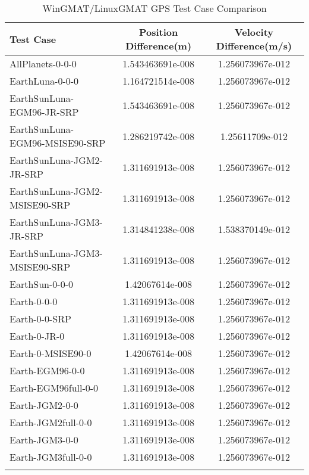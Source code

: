 \begin{table}[htbp!]
\centering
\caption{ WinGMAT/LinuxGMAT GPS Test Case Comparison}
      \begin{tabular}{lcc}
      \hline\hline
          Test Case & Position Difference(m) & Velocity Difference(m/s) \\
         \hline
         AllPlanets-0-0-0 & 1.543463691e-008 & 1.256073967e-012 \\
         EarthLuna-0-0-0 & 1.164721514e-008 & 1.256073967e-012 \\
         EarthSunLuna-EGM96-JR-SRP & 1.543463691e-008 & 1.256073967e-012 \\
         EarthSunLuna-EGM96-MSISE90-SRP & 1.286219742e-008 & 1.25611709e-012 \\
         EarthSunLuna-JGM2-JR-SRP & 1.311691913e-008 & 1.256073967e-012 \\
         EarthSunLuna-JGM2-MSISE90-SRP & 1.311691913e-008 & 1.256073967e-012 \\
         EarthSunLuna-JGM3-JR-SRP & 1.314841238e-008 & 1.538370149e-012 \\
         EarthSunLuna-JGM3-MSISE90-SRP & 1.311691913e-008 & 1.256073967e-012 \\
         EarthSun-0-0-0 & 1.42067614e-008 & 1.256073967e-012 \\
         Earth-0-0-0 & 1.311691913e-008 & 1.256073967e-012 \\
         Earth-0-0-SRP & 1.311691913e-008 & 1.256073967e-012 \\
         Earth-0-JR-0 & 1.311691913e-008 & 1.256073967e-012 \\
         Earth-0-MSISE90-0 & 1.42067614e-008 & 1.256073967e-012 \\
         Earth-EGM96-0-0 & 1.311691913e-008 & 1.256073967e-012 \\
         Earth-EGM96full-0-0 & 1.311691913e-008 & 1.256073967e-012 \\
         Earth-JGM2-0-0 & 1.311691913e-008 & 1.256073967e-012 \\
         Earth-JGM2full-0-0 & 1.311691913e-008 & 1.256073967e-012 \\
         Earth-JGM3-0-0 & 1.311691913e-008 & 1.256073967e-012 \\
         Earth-JGM3full-0-0 & 1.311691913e-008 & 1.256073967e-012 \\
      \hline\hline
      \label{Table: GPS WinGMAT-LinuxGMAT Table} 
\end{tabular}
\end{table}
